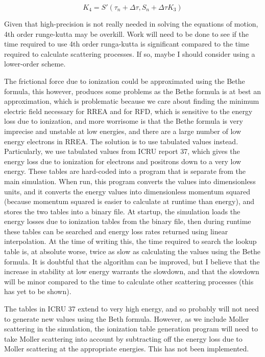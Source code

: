 \documentclass[]{article}
\begin{document}
\begin{equation} 
K_4=S'(\tau_n + \Delta\tau, S_n + \Delta\tau K_3)
\end{equation}

Given that high-precision is not really needed in solving the equations of motion, 4th order runge-kutta may be overkill.  Work will need to be done to see if the time required to use 4th order runga-kutta is significant compared to the time required to calculate scattering processes. If so, maybe I should consider using a lower-order scheme.

The frictional force due to ionization could be approximated using the Bethe formula, this however, produces some problems as the Bethe formula is at best an approximation, which is problematic because we care about finding the minimum electric field necessary for RREA and for RFD, which is sensitive to the energy loss due to ionization, and more worrisome is that the Bethe formula is very imprecise and unstable at low energies, and there are a large number of low energy electrons in RREA. The solution is to use tabulated values instead. Particularly, we use tabulated values from ICRU report 37, which gives the energy loss due to ionization for electrons and positrons down to a very low energy. These tables are hard-coded into a program that is separate from the main simulation. When run, this program converts the values into dimensionless units, and it converts the energy values into dimensionless momentum squared (because momentum squared is easier to calculate at runtime than energy), and stores the two tables into a binary file. At startup, the simulation loads the energy losses due to ionization tables from the binary file, then during runtime these tables can be searched and energy loss rates returned using linear interpolation. At the time of writing this, the time required to search the lookup table is, at absolute worse, twice as slow as calculating the values using the Bethe formula. It is doubtful that the algorithm can be improved, but I believe that the increase in stability at low energy warrants the slowdown, and that the slowdown will be minor compared to the time to calculate other scattering  processes (this has yet to be shown). 

The tables in ICRU 37 extend to very high energy, and so probably will not need to generate new values using the Beth formula. However, as we include Moller scattering in the simulation, the ionization table generation program will need to take Moller scattering into account by subtracting off the energy loss due to Moller scattering at the appropriate energies. This has not been implemented.
\end{document}
